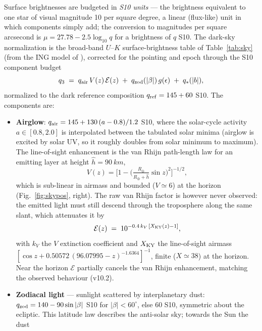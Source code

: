 Surface brightnesses are budgeted in \emph{S10 units} — the brightness
equivalent to one star of visual magnitude 10 per square degree, a linear
(flux-like) unit in which components simply add; the conversion to
magnitudes per square arcsecond is $\mu = 27.78 - 2.5\log_{10}q$ for a
brightness of $q$ S10. The dark-sky normalization is the broad-band
$U$--$K$ surface-brightness table of Table~\ref{tab:sky} (from the ING
model of \citealt{bennellison1998}), corrected for the pointing and epoch
through the S10 component budget
\begin{equation}
  q_3 \;=\; q_{\rm air}\,V(z)\,\mathcal{E}(z) \;+\;
            q_{\rm zod}(|\beta|)\,g(\epsilon) \;+\; q_\ast(|b|),
\end{equation}
normalized to the dark reference composition $q_{\rm ref} = 145 + 60$ S10.
The components are:
\begin{itemize}
\item \textbf{Airglow}: $q_{\rm air} = 145 + 130\,(a-0.8)/1.2$ S10, where the
  solar-cycle activity $a \in [0.8, 2.0]$ is interpolated between the
  tabulated solar minima (airglow is excited by solar UV, so it roughly
  doubles from solar minimum to maximum). The line-of-sight enhancement is
  the van Rhijn path-length law \citep{vanrhijn1921} for an emitting layer
  at height $\hat h = \SI{90}{km}$,
  \begin{equation}
    V(z) = \Big[1 - \Big(\tfrac{R_\oplus}{R_\oplus+\hat h}\sin z\Big)^2\Big]^{-1/2},
    \label{eq:vanrhijn}
  \end{equation}
  which is sub-linear in airmass and bounded ($V \simeq 6$) at the horizon
  (Fig.~\ref{fig:skypos}, right). The raw van Rhijn factor is however
  never observed: the emitted light must still descend through the
  troposphere along the same slant, which attenuates it by
  \begin{equation}
    \mathcal{E}(z) \;=\; 10^{-0.4\,k_V\,[X_{\rm KY}(z) - 1]},
  \end{equation}
  with $k_V$ the $V$ extinction coefficient and $X_{\rm KY}$ the
  \citet{kasten1989} line-of-sight airmass
  $[\cos z + 0.50572\,(96.07995-z)^{-1.6364}]^{-1}$, finite
  ($X \simeq 38$) at the horizon. Near the horizon $\mathcal{E}$
  partially cancels the van Rhijn enhancement, matching the observed
  behaviour (v10.2).
\item \textbf{Zodiacal light} — sunlight scattered by interplanetary
  dust: $q_{\rm zod} = 140 - 90 \sin|\beta|$ S10 for
  $|\beta| < 60^\circ$, else 60 S10, symmetric about the ecliptic. This
  latitude law describes the anti-solar sky; towards the Sun the dust

\end{itemize}
